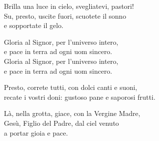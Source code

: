 
\strofa Brilla una luce in cielo, svegliatevi, pastori!\\
Su, presto, uscite fuori, scuotete il sonno\\
e sopportate il gelo.

\spazio

\strofa Gloria al Signor, per l'universo intero,\\
e pace in terra ad ogni uom sincero.\\
Gloria al Signor, per l'universo intero,\\
e pace in terra ad ogni uom sincero.

\spazio

\strofa Presto, correte tutti, con dolci canti e suoni,\\
recate i vostri doni: gustoso pane e saporosi frutti.

\spazio

\strofa Là, nella grotta, giace, con la Vergine Madre,\\
Gesù, Figlio del Padre, dal ciel venuto\\
a portar gioia e pace.